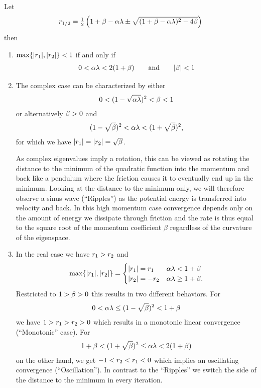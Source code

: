 \begin{theorem}
	\label{thm: momentum - stable set of parameters}
	Let
	\begin{align*}
		r_{1/2}
		= \tfrac12 \left(
			1+\beta-\alpha\lambda \pm \sqrt{(1+\beta-\alpha\lambda)^2 - 4\beta}
		\right)
	\end{align*}
	then 
	\begin{enumerate}
		\item \(\max\{|r_1|,|r_2|\}<1\) if and only if
		\begin{align*}
			0<\alpha\lambda < 2(1+\beta) \qquad \text{and} \qquad |\beta|<1
		\end{align*}
		\item The complex case can be characterized by either
		\begin{align*}
			0<(1-\sqrt{\alpha\lambda})^2 < \beta < 1
		\end{align*}		
		or alternatively \(\beta>0\) and
		\begin{align*}
			(1-\sqrt{\beta})^2 < \alpha\lambda < (1+\sqrt{\beta})^2,
		\end{align*}
		for which we have \(|r_1|=|r_2|=\sqrt{\beta}\).
		
		As complex
		eigenvalues imply a rotation, this can be viewed as rotating the distance
		to the minimum of the quadratic function into the momentum and back like 
		a pendulum where the friction causes it to eventually end up in the
		minimum. Looking at the distance to the minimum only, we will therefore
		observe a sinus wave (``Ripples'') as the potential energy is transferred
		into velocity and back. In this high momentum case convergence depends
		only on the amount of energy we dissipate through friction and the rate is
		thus equal to the square root of the momentum coefficient \(\beta\)
		regardless of the curvature of the eigenspace.
		\item In the real case we have \(r_1>r_2\) and
		\begin{align}
			\max\{|r_1|, |r_2|\} = \begin{cases}
				|r_1|=r_1 & \alpha\lambda < 1+\beta \\
				|r_2|=-r_2 & \alpha\lambda \ge 1+\beta.
			\end{cases}
		\end{align}
		Restricted to \(1>\beta>0\) this results in two different	
		behaviors. For
		\begin{align*}
			0<\alpha\lambda \le (1-\sqrt{\beta})^2 < 1+\beta
		\end{align*}
		we have \(1>r_1 > r_2 > 0\) which results in a monotonic
		linear convergence (``Monotonic'' case). For
		\begin{align*}
			1+\beta < (1+\sqrt{\beta})^2\le \alpha\lambda < 2(1+\beta)
		\end{align*}
		on the other hand, we get \(-1 < r_2 < r_1 < 0\) which implies 
		an oscillating convergence (``Oscillation''). In contrast to the ``Ripples''
		we switch the side of the distance to the minimum in every iteration.
	\end{enumerate}
\end{theorem}

